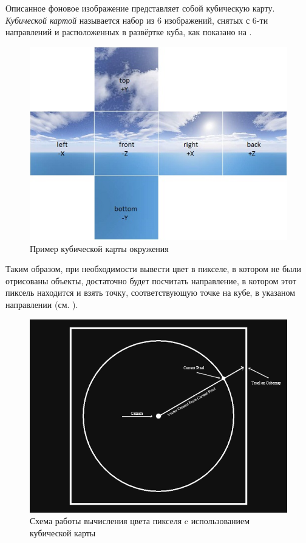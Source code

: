 		Описанное фоновое изображение представляет собой кубическую карту. \textit{Кубической картой} называется набор из 6 изображений, снятых с 6-ти направлений и расположенных в развёртке куба, как показано на .
		
		\begin{figure}[ht!] 
			\center
			\includegraphics [scale=0.8] {my_folder/images//skybox}	
			\caption{Пример кубической карты окружения} 
			\label{fig:skybox}
		\end{figure}
		
		Таким образом, при необходимости вывести цвет в пикселе, в котором не были отрисованы объекты, достаточно будет посчитать направление, в котором этот пиксель находится и взять точку, соответствующую точке на кубе, в указаном направлении (см. ).
		
		\begin{figure}[ht!] 
			\center
			\includegraphics [scale=1] {my_folder/images//cube_sample}	
			\caption{Схема работы вычисления цвета пикселя c использованием кубической карты} 
			\label{fig:cube_sample}
		\end{figure}
		
